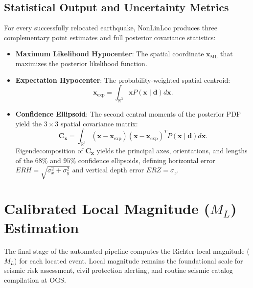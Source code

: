 \subsection{Statistical Output and Uncertainty Metrics}
For every successfully relocated earthquake, NonLinLoc produces three complementary point estimates and full posterior covariance statistics:
\begin{itemize}
  \item \textbf{Maximum Likelihood Hypocenter}: The spatial coordinate $\mathbf{x}_{\mathrm{ML}}$ that maximizes the posterior likelihood function.
  \item \textbf{Expectation Hypocenter}: The probability-weighted spatial centroid:
  \begin{equation}
    \mathbf{x}_{\mathrm{exp}} = \int_{\mathbb{R}^3} \mathbf{x} P(\mathbf{x} \mid \mathbf{d}) d\mathbf{x}.
  \end{equation}
  \item \textbf{Confidence Ellipsoid}: The second central moments of the posterior PDF yield the $3 \times 3$ spatial covariance matrix:
  \begin{equation}
    \mathbf{C}_{\mathbf{x}} = \int_{\mathbb{R}^3} (\mathbf{x} - \mathbf{x}_{\mathrm{exp}})(\mathbf{x} - \mathbf{x}_{\mathrm{exp}})^T P(\mathbf{x} \mid \mathbf{d}) d\mathbf{x}.
  \end{equation}
  Eigendecomposition of $\mathbf{C}_{\mathbf{x}}$ yields the principal axes, orientations, and lengths of the $68\%$ and $95\%$ confidence ellipsoids, defining horizontal error $ERH = \sqrt{\sigma_x^2 + \sigma_y^2}$ and vertical depth error $ERZ = \sigma_z$.
\end{itemize}

\section{Calibrated Local Magnitude ($M_L$) Estimation}
\label{sec:magnitude_estimation}

The final stage of the automated pipeline computes the Richter local magnitude ($M_L$) for each located event. Local magnitude remains the foundational scale for seismic risk assessment, civil protection alerting, and routine seismic catalog compilation at OGS.

